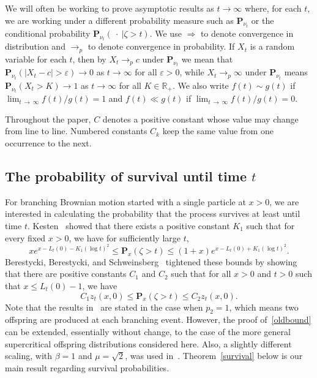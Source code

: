 \documentclass[AHL,Unicode,longabstracts,published]{cedram}
\newcommand*\eps{\varepsilon}
\renewcommand*\P{\mathbf{P}}
\newcommand*\R{\mathbb{R}}
\newcommand{\1} {\mathds{1}}
\begin{document}
We will often be working to prove asymptotic results as $t \rightarrow \infty$ where, for each $t$, we are working under a different probability measure such as $\P_{\nu_t}$ or the conditional probability $\P_{\nu_t}(\:\cdot \:|\zeta > t)$. We use $\Rightarrow$ to denote convergence in distribution and $\rightarrow_p$ to denote convergence in probability. If $X_t$ is a random variable for each $t$, then by $X_t \rightarrow_p c$ under $\P_{\nu_t}$ we mean that $\P_{\nu_t}(|X_t - c| > \eps) \rightarrow 0$ as $t \rightarrow \infty$ for all $\eps > 0$, while $X_t \rightarrow_p \infty$ under $\P_{\nu_t}$ means $\P_{\nu_t}(X_t > K) \rightarrow 1$ as $t \rightarrow \infty$ for all $K \in \R_+$. We also write $f(t) \sim g(t)$ if $\lim_{t\,\rightarrow\,\infty} f(t)/g(t) = 1$ and $f(t) \ll g(t)$ if $\lim_{t\,\rightarrow\,\infty} f(t)/g(t) = 0$.

Throughout the paper, $C$ denotes a positive constant whose value may change from line to line. Numbered constants $C_k$ keep the same value from one occurrence to the next.

\subsection{The probability of survival until time \texorpdfstring{$t$}{t}}

For branching Brownian motion started with a single particle at $x > 0$, we are interested in calculating the probability that the process survives at least until time $t$. Kesten~\cite{kesten} showed that there exists a positive constant $K_1$ such that for every fixed $x > 0$, we have for sufficiently large $t$,
\[
x e^{x - L_t(0) - K_1(\log t)^2} \leq \P_x(\zeta > t) \leq (1 + x)e^{x - L_t(0) + K_1(\log t)^2}.
\]
Berestycki, Berestycki, and Schweinsberg~\cite{bbs} tightened these bounds by showing that there are positive constants $C_1$ and $C_2$ such that for all $x > 0$ and $t > 0$ such that $x \leq L_t(0) - 1$, we have
\begin{equation}\label{oldbound}
C_1 z_t(x,0) \leq \P_x(\zeta > t) \leq C_2 z_t(x,0).
\end{equation}
Note that the results in~\cite{bbs} are stated in the case when $p_2 = 1$, which means two offspring are produced at each branching event. However, the proof of~\eqref{oldbound} can be extended, essentially without change, to the case of the more general supercritical offspring distributions considered here. Also, a slightly different scaling, with $\beta = 1$ and $\mu = \sqrt{2}$, was used in~\cite{bbs}. Theorem~\ref{survival} below is our main result regarding survival probabilities.
\end{document}
